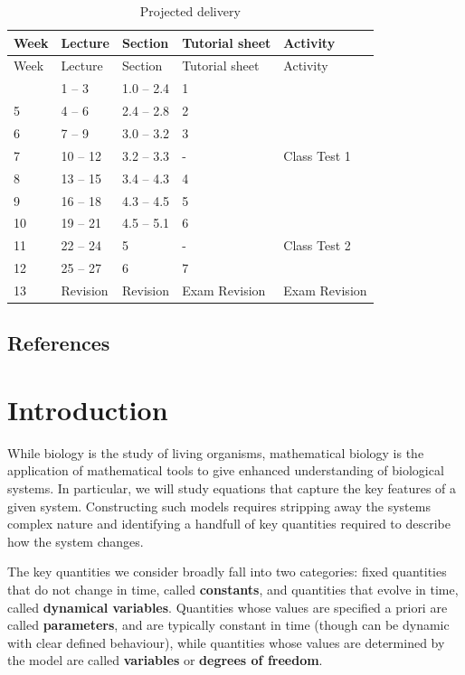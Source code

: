 \documentclass[
  letterpaper,
  DIV=11,
  numbers=noendperiod]{scrreprt}
\begin{document}
\begin{longtable}[]{@{}lllll@{}}
\caption{Projected delivery}\tabularnewline
\toprule\noalign{}
Week & Lecture & Section & Tutorial sheet & Activity \\
\midrule\noalign{}
\endfirsthead
\toprule\noalign{}
Week & Lecture & Section & Tutorial sheet & Activity \\
\midrule\noalign{}
\endhead
\bottomrule\noalign{}
\endlastfoot
4 & 1 -- 3 & 1.0 -- 2.4 & 1 & \\
5 & 4 -- 6 & 2.4 -- 2.8 & 2 & \\
6 & 7 -- 9 & 3.0 -- 3.2 & 3 & \\
7 & 10 -- 12 & 3.2 -- 3.3 & - & Class Test 1 \\
8 & 13 -- 15 & 3.4 -- 4.3 & 4 & \\
9 & 16 -- 18 & 4.3 -- 4.5 & 5 & \\
10 & 19 -- 21 & 4.5 -- 5.1 & 6 & \\
11 & 22 -- 24 & 5 & - & Class Test 2 \\
12 & 25 -- 27 & 6 & 7 & \\
13 & Revision & Revision & Exam Revision & Exam Revision \\
\end{longtable}

\section*{References}\label{references}



\chapter{Introduction}\label{introduction}

While biology is the study of living organisms, mathematical biology is
the application of mathematical tools to give enhanced understanding of
biological systems. In particular, we will study equations that capture
the key features of a given system. Constructing such models requires
stripping away the systems complex nature and identifying a handfull of
key quantities required to describe how the system changes.

The key quantities we consider broadly fall into two categories: fixed
quantities that do not change in time, called \textbf{constants}, and
quantities that evolve in time, called \textbf{dynamical variables}.
Quantities whose values are specified a priori are called
\textbf{parameters}, and are typically constant in time (though can be
dynamic with clear defined behaviour), while quantities whose values are
determined by the model are called \textbf{variables} or \textbf{degrees
of freedom}.
\end{document}
